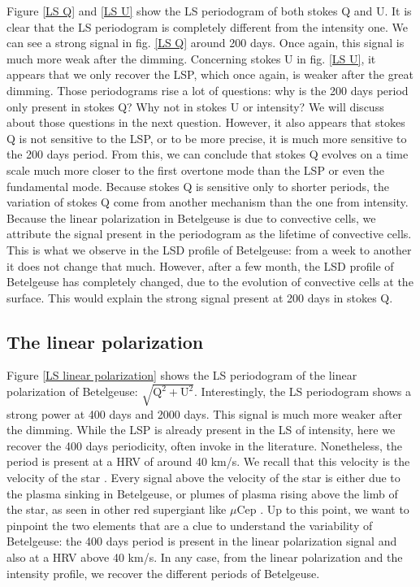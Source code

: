 \documentclass{aa}
\begin{document}
Figure \ref{LS Q} and \ref{LS U} show the LS periodogram of both stokes Q and U. It is clear that the LS periodogram is completely different 
from the intensity one. We can see a strong signal in fig. \ref{LS Q} around 200 days. Once again, this signal is much more weak after the dimming.
Concerning stokes U in fig. \ref{LS U}, it appears that we only recover the LSP, which once again, is weaker after the great dimming. 
Those periodograms rise a lot of questions: why is the 200 days period only present in stokes Q? Why not in stokes U or intensity? 
We will discuss about those questions in the next question. However, it also appears that stokes Q is not sensitive to the LSP, or to be more precise, 
it is much more sensitive to the 200 days period. From this, we can conclude that stokes Q evolves on a time scale much more closer to the first overtone 
mode than the LSP or even the fundamental mode. Because stokes Q is sensitive only to shorter periods, the variation of stokes Q come from another mechanism 
than the one from intensity. Because the linear polarization in Betelgeuse is due to convective cells, we attribute the signal present in the periodogram 
as the lifetime of convective cells. This is what we observe in the LSD profile of Betelgeuse: from a week to another it does not change that much. 
However, after a few month, the LSD profile of Betelgeuse has completely changed, due to the evolution of convective cells at the surface. 
This would explain the strong signal present at 200 days in stokes Q. 


\subsection{The linear polarization}

Figure \ref{LS linear polarization} shows the LS periodogram of the linear polarization of Betelgeuse: $\sqrt{\mathrm{Q^2+U^2}}$. 
Interestingly, the LS periodogram shows a strong power at 400 days and 2000 days. This signal is much more weaker after the dimming.
While the LSP is already present in the LS of intensity, here we recover the 400 days periodicity, often invoke in the literature. 
Nonetheless, the period is present at a HRV of around 40 km/s. We recall that this velocity is the velocity of the star \cite{LopezAriste2018}. 
Every signal above the velocity of the star is either due to the plasma sinking in Betelgeuse, or plumes of plasma rising above the limb of the star, 
as seen in other red supergiant like $\mu$Cep \citep{LopezAriste2023}. Up to this point, we want to pinpoint the two elements that are a clue 
to understand the variability of Betelgeuse: the 400 days period is present in the linear polarization signal and also at a HRV above 40 km/s.
In any case, from the linear polarization and the intensity profile, we recover the different periods of Betelgeuse.
\end{document}
